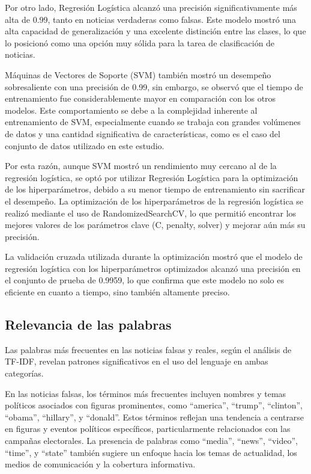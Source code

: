 \documentclass[journal]{IEEEtran}
\begin{document}
Por otro lado, Regresión Logística alcanzó una precisión significativamente más alta de 0.99, tanto en noticias verdaderas como falsas. Este modelo mostró una alta capacidad de generalización y una excelente distinción entre las clases, lo que lo posicionó como una opción muy sólida para la tarea de clasificación de noticias.

Máquinas de Vectores de Soporte (SVM) también mostró un desempeño sobresaliente con una precisión de 0.99, sin embargo, se observó que el tiempo de entrenamiento fue considerablemente mayor en comparación con los otros modelos. Este comportamiento se debe a la complejidad inherente al entrenamiento de SVM, especialmente cuando se trabaja con grandes volúmenes de datos y una cantidad significativa de características, como es el caso del conjunto de datos utilizado en este estudio.

Por esta razón, aunque SVM mostró un rendimiento muy cercano al de la regresión logística, se optó por utilizar Regresión Logística para la optimización de los hiperparámetros, debido a su menor tiempo de entrenamiento sin sacrificar el desempeño. La optimización de los hiperparámetros de la regresión logística se realizó mediante el uso de RandomizedSearchCV, lo que permitió encontrar los mejores valores de los parámetros clave (C, penalty, solver) y mejorar aún más su precisión.

La validación cruzada utilizada durante la optimización mostró que el modelo de regresión logística con los hiperparámetros optimizados alcanzó una precisión en el conjunto de prueba de 0.9959, lo que confirma que este modelo no solo es eficiente en cuanto a tiempo, sino también altamente preciso.

\subsection{Relevancia de las palabras}
Las palabras más frecuentes en las noticias falsas y reales, según el análisis de TF-IDF, revelan patrones significativos en el uso del lenguaje en ambas categorías.

En las noticias falsas, los términos más frecuentes incluyen nombres y temas políticos asociados con figuras prominentes, como “america”, “trump”, “clinton”, “obama”, “hillary”, y “donald”. Estos términos reflejan una tendencia a centrarse en figuras y eventos políticos específicos, particularmente relacionados con las campañas electorales. La presencia de palabras como “media”, “news”, “video”, “time”, y “state” también sugiere un enfoque hacia los temas de actualidad, los medios de comunicación y la cobertura informativa.
\end{document}
